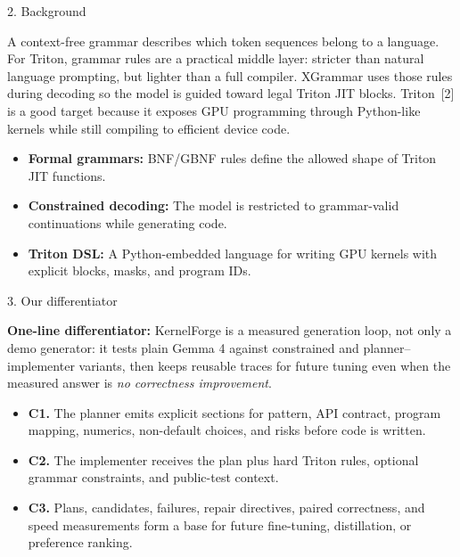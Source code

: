 \documentclass[final]{beamer}
\newlength{\colwidth}
\begin{document}
\begin{frame}[t]
\begin{columns}[t]
\begin{column}{\colwidth}
  \begin{block}{2. Background}

    A context-free grammar describes which token sequences belong to a language.
    For Triton, grammar rules are a practical middle layer: stricter than natural
    language prompting, but lighter than a full compiler. XGrammar uses those
    rules during decoding so the model is guided toward legal Triton JIT blocks.
    Triton~[2] is a good target because it exposes GPU programming through Python-like
    kernels while still compiling to efficient device code.

    \begin{itemize}
      \item \textbf{Formal grammars:} BNF/GBNF rules define the allowed shape of Triton JIT functions.
      \item \textbf{Constrained decoding:} The model is restricted to grammar-valid continuations while generating code.
      \item \textbf{Triton DSL:} A Python-embedded language for writing GPU kernels with explicit blocks, masks, and program IDs.
    \end{itemize}

  \end{block}

  \begin{alertblock}{3. Our differentiator}

    \textbf{One-line differentiator:} KernelForge is a measured generation loop,
    not only a demo generator: it tests plain Gemma 4 against constrained and
    planner--implementer variants, then keeps reusable traces for future tuning
    even when the measured answer is \emph{no correctness improvement}.

    \begin{itemize}
      \item \textbf{C1.} The planner emits explicit sections for pattern, API contract, program mapping, numerics, non-default choices, and risks before code is written.
      \item \textbf{C2.} The implementer receives the plan plus hard Triton rules, optional grammar constraints, and public-test context.
      \item \textbf{C3.} Plans, candidates, failures, repair directives, paired correctness, and speed measurements form a base for future fine-tuning, distillation, or preference ranking.
    \end{itemize}


\end{alertblock}
\end{column}
\end{columns}
\end{frame}
\end{document}
